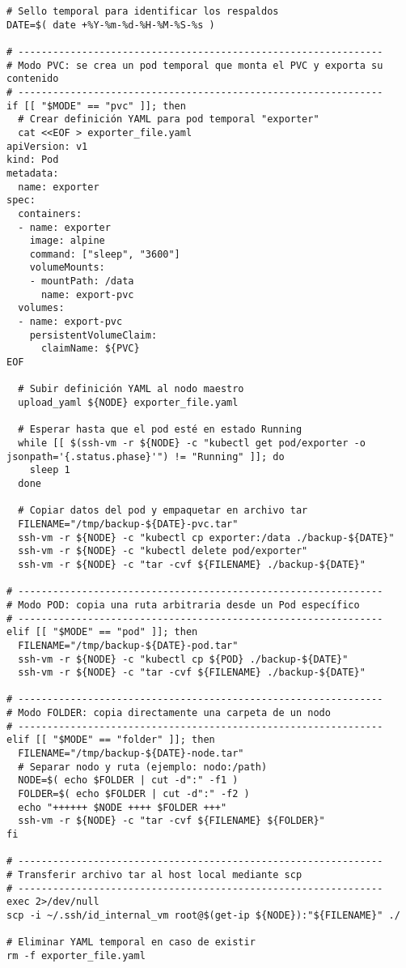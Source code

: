 \begin{verbatim}
# Sello temporal para identificar los respaldos
DATE=$( date +%Y-%m-%d-%H-%M-%S-%s )

# ---------------------------------------------------------------
# Modo PVC: se crea un pod temporal que monta el PVC y exporta su contenido
# ---------------------------------------------------------------
if [[ "$MODE" == "pvc" ]]; then
  # Crear definición YAML para pod temporal "exporter"
  cat <<EOF > exporter_file.yaml
apiVersion: v1
kind: Pod
metadata:
  name: exporter
spec:
  containers:
  - name: exporter
    image: alpine
    command: ["sleep", "3600"]
    volumeMounts:
    - mountPath: /data
      name: export-pvc
  volumes:
  - name: export-pvc
    persistentVolumeClaim:
      claimName: ${PVC}
EOF

  # Subir definición YAML al nodo maestro
  upload_yaml ${NODE} exporter_file.yaml

  # Esperar hasta que el pod esté en estado Running
  while [[ $(ssh-vm -r ${NODE} -c "kubectl get pod/exporter -o jsonpath='{.status.phase}'") != "Running" ]]; do
    sleep 1
  done

  # Copiar datos del pod y empaquetar en archivo tar
  FILENAME="/tmp/backup-${DATE}-pvc.tar"
  ssh-vm -r ${NODE} -c "kubectl cp exporter:/data ./backup-${DATE}"
  ssh-vm -r ${NODE} -c "kubectl delete pod/exporter"
  ssh-vm -r ${NODE} -c "tar -cvf ${FILENAME} ./backup-${DATE}"

# ---------------------------------------------------------------
# Modo POD: copia una ruta arbitraria desde un Pod específico
# ---------------------------------------------------------------
elif [[ "$MODE" == "pod" ]]; then
  FILENAME="/tmp/backup-${DATE}-pod.tar"
  ssh-vm -r ${NODE} -c "kubectl cp ${POD} ./backup-${DATE}"
  ssh-vm -r ${NODE} -c "tar -cvf ${FILENAME} ./backup-${DATE}"

# ---------------------------------------------------------------
# Modo FOLDER: copia directamente una carpeta de un nodo
# ---------------------------------------------------------------
elif [[ "$MODE" == "folder" ]]; then
  FILENAME="/tmp/backup-${DATE}-node.tar"
  # Separar nodo y ruta (ejemplo: nodo:/path)
  NODE=$( echo $FOLDER | cut -d":" -f1 )
  FOLDER=$( echo $FOLDER | cut -d":" -f2 ) 
  echo "++++++ $NODE ++++ $FOLDER +++"
  ssh-vm -r ${NODE} -c "tar -cvf ${FILENAME} ${FOLDER}"
fi

# ---------------------------------------------------------------
# Transferir archivo tar al host local mediante scp
# ---------------------------------------------------------------
exec 2>/dev/null
scp -i ~/.ssh/id_internal_vm root@$(get-ip ${NODE}):"${FILENAME}" ./

# Eliminar YAML temporal en caso de existir
rm -f exporter_file.yaml

\end{verbatim}